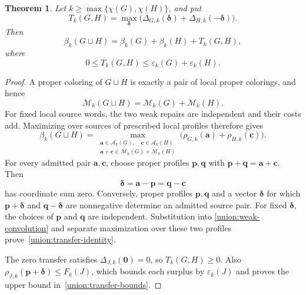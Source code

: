 \documentclass[10pt,a4paper]{amsart}
\numberwithin{equation}{section}
\newtheorem{theorem}{Theorem}[section]
\theoremstyle{definition}
\theoremstyle{remark}
\begin{document}
\begin{theorem}\label{union:transfer-theorem}
Let $k\ge\max\{\chi(G),\chi(H)\}$, and put
\[
 T_k(G,H)=\max_{\boldsymbol\delta}
  \bigl(\Delta_{G,k}(\boldsymbol\delta)
       +\Delta_{H,k}(-\boldsymbol\delta)\bigr).
\]
Then
\begin{equation}\label{union:transfer-identity}
 \beta_k(G\sqcup H)=\beta_k(G)+\beta_k(H)+T_k(G,H),
\end{equation}
where
\begin{equation}\label{union:transfer-bounds}
 0\le T_k(G,H)\le\varepsilon_k(G)+\varepsilon_k(H).
\end{equation}
\end{theorem}

\begin{proof}
A proper coloring of $G\sqcup H$ is exactly a pair of local proper
colorings, and hence
\[
 \mathcal M_k(G\sqcup H)=\mathcal M_k(G)+\mathcal M_k(H).
\]
For fixed local source words, the two weak repairs are independent and
their costs add.  Maximizing over sources of prescribed local profiles
therefore gives
\begin{equation}\label{union:weak-convolution}
 \beta_k(G\sqcup H)=
 \max_{\substack{\mathbf a\in\mathcal A_k(G),\quad
                  \mathbf c\in\mathcal A_k(H)\\
         \mathbf a+\mathbf c\in\mathcal M_k(G)+\mathcal M_k(H)}}
  \bigl(\rho_{G,k}(\mathbf a)+\rho_{H,k}(\mathbf c)\bigr).
\end{equation}
For every admitted pair $\mathbf a,\mathbf c$, choose proper profiles
$\mathbf p,\mathbf q$ with
$\mathbf p+\mathbf q=\mathbf a+\mathbf c$.  Then
\[
 \boldsymbol\delta=\mathbf a-\mathbf p
                  =\mathbf q-\mathbf c
\]
has coordinate sum zero.  Conversely, proper profiles
$\mathbf p,\mathbf q$ and a vector $\boldsymbol\delta$ for which
$\mathbf p+\boldsymbol\delta$ and
$\mathbf q-\boldsymbol\delta$ are nonnegative determine an admitted
source pair.  For fixed $\boldsymbol\delta$, the choices of
$\mathbf p$ and $\mathbf q$ are independent.  Substitution into
\eqref{union:weak-convolution} and separate maximization over these
two profiles prove~\eqref{union:transfer-identity}.

The zero transfer satisfies $\Delta_{J,k}(\mathbf0)=0$, so
$T_k(G,H)\ge0$.  Also
$\rho_{J,k}(\mathbf p+\boldsymbol\delta)\le F_k(J)$,
which bounds each surplus by $\varepsilon_k(J)$ and proves the upper
bound in~\eqref{union:transfer-bounds}.
\end{proof}
\end{document}
